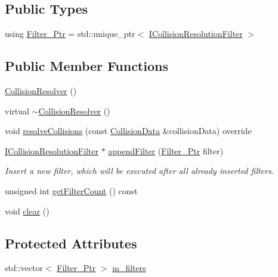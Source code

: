 \subsection*{Public Types}
\begin{DoxyCompactItemize}
\item 
using \mbox{\hyperlink{classr3_1_1_collision_resolver_ad1c9ca40341498c0fe4d483d21c8eb9b}{Filter\+\_\+\+Ptr}} = std\+::unique\+\_\+ptr$<$ \mbox{\hyperlink{classr3_1_1_i_collision_resolution_filter}{I\+Collision\+Resolution\+Filter}} $>$
\end{DoxyCompactItemize}
\subsection*{Public Member Functions}
\begin{DoxyCompactItemize}
\item 
\mbox{\hyperlink{classr3_1_1_collision_resolver_a7b90e276403fa8422879228a189432fb}{Collision\+Resolver}} ()
\item 
virtual \mbox{\hyperlink{classr3_1_1_collision_resolver_ad172d58efecf5ef38f42020f21746f02}{$\sim$\+Collision\+Resolver}} ()
\item 
void \mbox{\hyperlink{classr3_1_1_collision_resolver_a5eeac10ca33299662b0df8a77f6c25f5}{resolve\+Collisions}} (const \mbox{\hyperlink{classr3_1_1_collision_data}{Collision\+Data}} \&collision\+Data) override
\item 
\mbox{\hyperlink{classr3_1_1_i_collision_resolution_filter}{I\+Collision\+Resolution\+Filter}} $\ast$ \mbox{\hyperlink{classr3_1_1_collision_resolver_a9409413937188dbd5332c3440c2a8834}{append\+Filter}} (\mbox{\hyperlink{classr3_1_1_collision_resolver_ad1c9ca40341498c0fe4d483d21c8eb9b}{Filter\+\_\+\+Ptr}} filter)
\begin{DoxyCompactList}\small\item\em Insert a new filter, which will be executed after all already inserted filters. \end{DoxyCompactList}\item 
unsigned int \mbox{\hyperlink{classr3_1_1_collision_resolver_ae56e2125e24982ad368f0d87e9c2a28f}{get\+Filter\+Count}} () const
\item 
void \mbox{\hyperlink{classr3_1_1_collision_resolver_a1f4e3d97afae66c03581807a529678cd}{clear}} ()
\end{DoxyCompactItemize}
\subsection*{Protected Attributes}
\begin{DoxyCompactItemize}
\item 
std\+::vector$<$ \mbox{\hyperlink{classr3_1_1_collision_resolver_ad1c9ca40341498c0fe4d483d21c8eb9b}{Filter\+\_\+\+Ptr}} $>$ \mbox{\hyperlink{classr3_1_1_collision_resolver_abf1234ad45ba7f114b31950c90ccaaff}{m\+\_\+filters}}
\end{DoxyCompactItemize}
